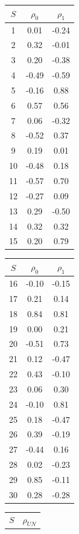 \documentclass[a4paper,12pt]{article}
\begin{document}
	\begin{table}[H]
		\centering
		\begin{tabular}{ccc}
			\hline
			$S$ & $\rho_{0}$ & $\rho_{1}$ \\ 
			\hline
			1 & 0.01 & -0.24 \\ 
			2 & 0.32 & -0.01 \\ 
			3 & 0.20 & -0.38 \\ 
			4 & -0.49 & -0.59 \\ 
			5 & -0.16 & 0.88 \\ 
			6 & 0.57 & 0.56 \\ 
			7 & 0.06 & -0.32 \\ 
			8 & -0.52 & 0.37 \\ 
			9 & 0.19 & 0.01 \\ 
			10 & -0.48 & 0.18 \\ 
			11 & -0.57 & 0.70 \\ 
			12 & -0.27 & 0.09 \\ 
			13 & 0.29 & -0.50 \\ 
			14 & 0.32 & 0.32 \\ 
			15 & 0.20 & 0.79 \\
			\hline
		\end{tabular}
		\quad
		\begin{tabular}{ccc}
			\hline
			$S$ & $\rho_{0}$ & $\rho_{1}$ \\ 
			\hline
			16 & -0.10 & -0.15 \\ 
			17 & 0.21 & 0.14 \\ 
			18 & 0.84 & 0.81 \\ 
			19 & 0.00 & 0.21 \\ 
			20 & -0.51 & 0.73 \\ 
			21 & 0.12 & -0.47 \\ 
			22 & 0.43 & -0.10 \\ 
			23 & 0.06 & 0.30 \\ 
			24 & -0.10 & 0.81 \\ 
			25 & 0.18 & -0.47 \\ 
			26 & 0.39 & -0.19 \\ 
			27 & -0.44 & 0.16 \\ 
			28 & 0.02 & -0.23 \\ 
			29 & 0.85 & -0.11 \\ 
			30 & 0.28 & -0.28 \\ 
			\hline
		\end{tabular}
		\quad
		\begin{tabular}{cc}
			\hline
			$S$ & $\rho_{UN}$ \\ 

\end{tabular}
\end{table}
\end{document}
